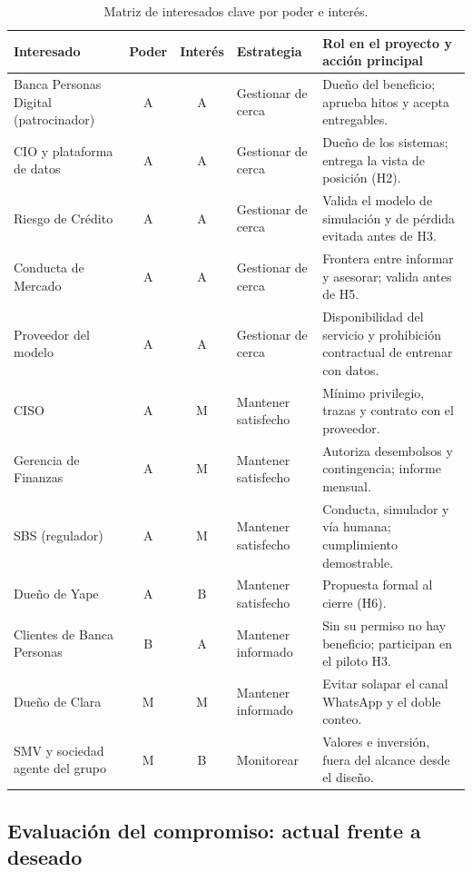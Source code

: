 \documentclass[11pt,a4paper]{article}
\begin{document}
\begin{table}[H]
\centering
\caption{Matriz de interesados clave por poder e interés.}
\small
\setlength{\tabcolsep}{4pt}
\begin{tabularx}{\textwidth}{@{}p{3.4cm} c c >{\raggedright\arraybackslash}p{2.9cm} X@{}}
\toprule
\textbf{Interesado} & \textbf{Poder} & \textbf{Interés} & \textbf{Estrategia} & \textbf{Rol en el proyecto y acción principal} \\
\midrule
Banca Personas Digital (patrocinador) & A & A & Gestionar de cerca & Dueño del beneficio; aprueba hitos y acepta entregables. \\
CIO y plataforma de datos & A & A & Gestionar de cerca & Dueño de los sistemas; entrega la vista de posición (H2). \\
Riesgo de Crédito & A & A & Gestionar de cerca & Valida el modelo de simulación y de pérdida evitada antes de H3. \\
Conducta de Mercado & A & A & Gestionar de cerca & Frontera entre informar y asesorar; valida antes de H5. \\
Proveedor del modelo & A & A & Gestionar de cerca & Disponibilidad del servicio y prohibición contractual de entrenar con datos. \\
CISO & A & M & Mantener satisfecho & Mínimo privilegio, trazas y contrato con el proveedor. \\
Gerencia de Finanzas & A & M & Mantener satisfecho & Autoriza desembolsos y contingencia; informe mensual. \\
SBS (regulador) & A & M & Mantener satisfecho & Conducta, simulador y vía humana; cumplimiento demostrable. \\
Dueño de Yape & A & B & Mantener satisfecho & Propuesta formal al cierre (H6). \\
Clientes de Banca Personas & B & A & Mantener informado & Sin su permiso no hay beneficio; participan en el piloto H3. \\
Dueño de Clara & M & M & Mantener informado & Evitar solapar el canal WhatsApp y el doble conteo. \\
SMV y sociedad agente del grupo & M & B & Monitorear & Valores e inversión, fuera del alcance desde el diseño. \\
\bottomrule
\end{tabularx}
\end{table}

\subsection{Evaluación del compromiso: actual frente a deseado}
\end{document}
